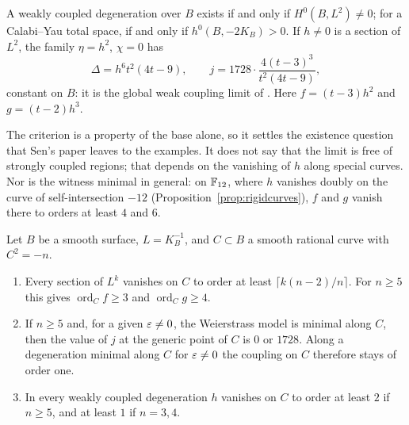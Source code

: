 \begin{corollary}\label{cor:existence}
A weakly coupled degeneration over $B$ exists if and only if $H^0(B,L^2)\ne0$; for a Calabi--Yau total space, if and only if $h^0(B,-2K_B)>0$. If $h\ne0$ is a section of $L^2$, the family $\eta=h^2$, $\chi=0$ has
\[
\Delta=h^6t^2(4t-9),\qquad j=1728\cdot\frac{4(t-3)^3}{t^2(4t-9)},
\]
constant on $B$: it is the global weak coupling limit of \cite[Eqs.~(2.13)--(2.15)]{HLS18}. Here $f=(t-3)h^2$ and $g=(t-2)h^3$.
\end{corollary}

The criterion is a property of the base alone, so it settles the existence question that Sen's paper leaves to the examples. It does not say that the limit is free of strongly coupled regions; that depends on the vanishing of $h$ along special curves. Nor is the witness minimal in general: on $\mathbb{F}_{12}$, where $h$ vanishes doubly on the curve of self-intersection $-12$ (Proposition~\ref{prop:rigidcurves}), $f$ and $g$ vanish there to orders at least $4$ and $6$.

\begin{proposition}\label{prop:rigidcurves}
Let $B$ be a smooth surface, $L=K_B^{-1}$, and $C\subset B$ a smooth rational curve with $C^2=-n$.
\begin{enumerate}[label=(\roman*),leftmargin=2em]
\item Every section of $L^k$ vanishes on $C$ to order at least $\lceil k(n-2)/n\rceil$. For $n\ge5$ this gives $\operatorname{ord}_Cf\ge3$ and $\operatorname{ord}_Cg\ge4$.
\item If $n\ge5$ and, for a given $\varepsilon\ne0$, the Weierstrass model is minimal along $C$, then the value of $j$ at the generic point of $C$ is $0$ or $1728$. Along a degeneration minimal along $C$ for $\varepsilon\ne0$ the coupling on $C$ therefore stays of order one.
\item In every weakly coupled degeneration $h$ vanishes on $C$ to order at least $2$ if $n\ge5$, and at least $1$ if $n=3,4$.
\end{enumerate}
\end{proposition}

